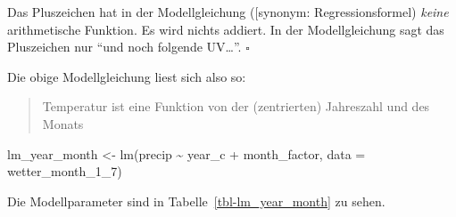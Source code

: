 \documentclass[
  letterpaper,
]{scrbook}
\newenvironment{Shaded}{\begin{snugshade}}{\end{snugshade}}
\newcommand{\AttributeTok}[1]{\textcolor[rgb]{0.40,0.45,0.13}{#1}}
\newcommand{\FunctionTok}[1]{\textcolor[rgb]{0.28,0.35,0.67}{#1}}
\newcommand{\NormalTok}[1]{\textcolor[rgb]{0.00,0.23,0.31}{#1}}
\newcommand{\OtherTok}[1]{\textcolor[rgb]{0.00,0.23,0.31}{#1}}
\newcommand{\SpecialCharTok}[1]{\textcolor[rgb]{0.37,0.37,0.37}{#1}}
\theoremstyle{definition}
\theoremstyle{definition}
\theoremstyle{definition}
\theoremstyle{remark}
\begin{document}
Das Pluszeichen hat in der Modellgleichung ({[}synonym:
Regressionsformel) \emph{keine} arithmetische Funktion. Es wird nichts
addiert. In der Modellgleichung sagt das Pluszeichen nur \enquote{und
noch folgende UV\ldots{}}. \(\square\)

Die obige Modellgleichung liest sich also so:

\begin{quote}
Temperatur ist eine Funktion von der (zentrierten) Jahreszahl und des
Monats
\end{quote}

\begin{Shaded}
\begin{Highlighting}[]
\NormalTok{lm\_year\_month }\OtherTok{\textless{}{-}} \FunctionTok{lm}\NormalTok{(precip }\SpecialCharTok{\textasciitilde{}}\NormalTok{ year\_c }\SpecialCharTok{+}\NormalTok{ month\_factor, }
                    \AttributeTok{data =}\NormalTok{ wetter\_month\_1\_7)}
\end{Highlighting}
\end{Shaded}

Die Modellparameter sind in Tabelle~\ref{tbl-lm_year_month} zu sehen.
\end{document}
